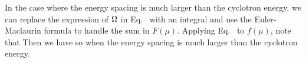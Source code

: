 {	In the case where the energy spacing is much larger than the cyclotron energy, we can replace the expression of $\Omega$ in Eq.~ with an integral and use the Euler-Maclaurin formula to handle the sum in $F(\mu)$.  Applying Eq.~ to $f(\mu)$, note that
	Then we have
	so
	when the energy spacing is much larger than the cyclotron energy.
}